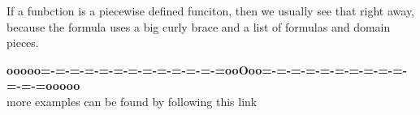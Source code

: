 \documentclass{ximera}
\begin{document}
If a funbction is a piecewise defined funciton, then we usually see that right away, because the formula uses a big curly brace and a list of formulas and domain pieces.













\begin{center}
\textbf{\textcolor{green!50!black}{ooooo=-=-=-=-=-=-=-=-=-=-=-=-=ooOoo=-=-=-=-=-=-=-=-=-=-=-=-=ooooo}} \\

more examples can be found by following this link\\ 

\end{center}
\end{document}
